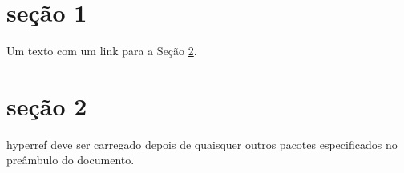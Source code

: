 \documentclass{article}
\begin{document}
	\section{seção 1}
	Um texto com um link para a Seção \ref{sec: next}.
	
	
	\section{seção 2}
	\label{sec: next}
	hyperref deve ser carregado depois de quaisquer outros pacotes especificados no preâmbulo do documento.
	
\end{document}
